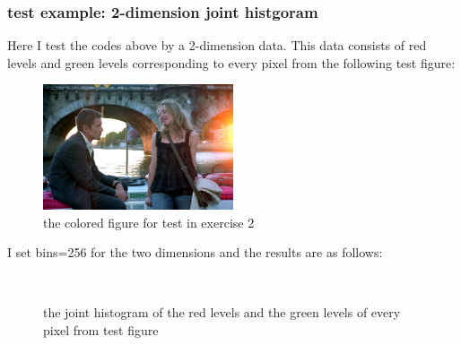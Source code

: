 \documentclass{article}
\begin{document}
\subsubsection{test example: 2-dimension joint histgoram}
Here I test the codes above by a 2-dimension data. This data consists of 
red levels and green levels corresponding to every pixel from the following test figure:
\begin{figure}[H]
    \centering  %
    \includegraphics[width=0.5\textwidth]{image//test2.jpg}
    \caption{the colored figure for test in exercise 2}
\end{figure}
I set bins=256 for the two dimensions and the results are as follows:
\begin{figure}[H]
	\centering
	\,    %
	\caption{the joint histogram of the red levels and the green levels of every pixel from test figure}
\end{figure}
\end{document}
